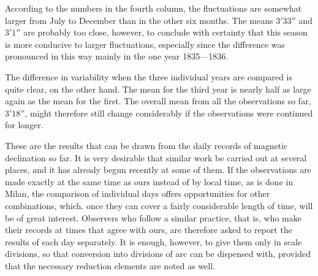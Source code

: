 According to the numbers in the fourth column, the fluctuations are somewhat larger from July to December than in the other six months. The means $3'33''$ and $3'1''$ are probably too close, however, to conclude with certainty that this season is more conducive to larger fluctuations, especially since the difference was pronounced in this way mainly in the one year 1835---1836.

The difference in variability when the three individual years are compared is quite clear, on the other hand. The mean for the third year is nearly half as large again as the mean for the first. The overall
mean from all the observations so far, $3'18''$, might therefore still change considerably if the observations were continued for longer.

These are the results that can be drawn from the daily records of magnetic declination so far. It is very desirable that similar work be carried out at several places, and it has already begun recently at some of them. If the observations are made exactly at the same time as ours instead of by local time, as is done in Milan, the comparison of individual days offers opportunities for other combinations, which. once they can cover a fairly considerable length of time, will be of great interest. Observers who follow a similar practice, that is, who make their records at times that agree with ours, are therefore asked to report the results of each day separately. It is enough, however, to give them only in scale divisions, so that conversion into divisions of arc can be dispensed with, provided that the necessary reduction elements are noted as well.

